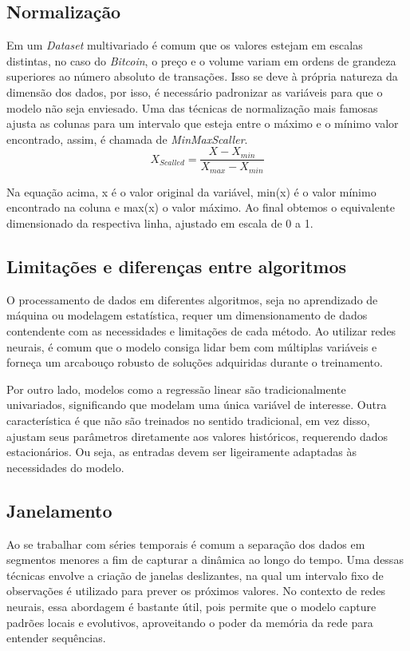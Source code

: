 \subsection{Normalização} \label{sec:normalizar}
Em um \textit{Dataset} multivariado é comum que os valores estejam em escalas distintas, no caso do \textit{Bitcoin}, o preço e o volume variam em ordens de grandeza superiores ao número absoluto de transações.
Isso se deve à própria natureza da dimensão dos dados, por isso, é necessário padronizar as variáveis para que o modelo não seja enviesado.
Uma das técnicas de normalização mais famosas ajusta as colunas para um intervalo que esteja entre o máximo e o mínimo valor encontrado, assim,  é chamada de \textit{MinMaxScaller}.
\begin{equation}
    {X_{Scalled} = \frac{X-X_{min}}{X_{max}-X_{min}}}
\end{equation}

Na equação acima, x é o valor original da variável, min(x) é o valor mínimo encontrado na coluna e max(x) o valor máximo.
Ao final obtemos o equivalente dimensionado da respectiva linha, ajustado em escala de 0 a 1.

\subsection{Limitações e diferenças entre algoritmos} \label{sec:limitacao}
O processamento de dados em diferentes algoritmos, seja no aprendizado de máquina ou modelagem estatística, requer um dimensionamento de dados contendente com as necessidades e limitações de cada método.
Ao utilizar redes neurais, é comum que o modelo consiga lidar bem com múltiplas variáveis e forneça um arcabouço robusto de soluções adquiridas durante o treinamento.

Por outro lado, modelos como a regressão linear são tradicionalmente univariados, significando que modelam uma única variável de interesse.
Outra característica é que não são treinados no sentido tradicional, em vez disso, ajustam seus parâmetros diretamente aos valores históricos, requerendo dados estacionários.
Ou seja, as entradas devem ser ligeiramente adaptadas às necessidades do modelo.

\subsection{Janelamento} \label{sec:janelamento}

Ao se trabalhar com séries temporais é comum a separação dos dados em segmentos menores
 a fim de capturar a dinâmica ao longo do tempo.
Uma dessas técnicas envolve a criação de janelas deslizantes, na qual um intervalo fixo de observações é utilizado para prever os próximos valores.
No contexto de redes neurais, essa abordagem é bastante útil, pois permite que o modelo capture padrões locais e evolutivos, aproveitando o poder da memória da rede para entender sequências.


